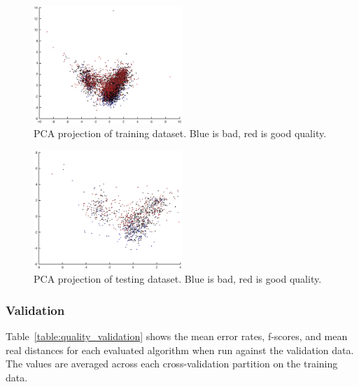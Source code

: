 \documentclass[twoside]{article}
\begin{document}
\begin{multicols}{2}
\begin{figure}[H]
\centering
\includegraphics[width=0.5\textwidth]{qpcatraining}
\caption{PCA projection of training dataset. Blue is bad, red is good quality.}
\label{fig:quality_training_pca}
\end{figure}

\begin{figure}[H]
\centering
\includegraphics[width=0.5\textwidth]{qpcatesting}
\caption{PCA projection of testing dataset. Blue is bad, red is good quality.}
\label{fig:quality_testing_pca}
\end{figure}

\subsubsection{Validation}

Table~\ref{table:quality_validation} shows the mean error rates, f-scores, and mean real distances for each evaluated algorithm when run against the validation data. The values are averaged across each
cross-validation partition on the training data.


\end{multicols}
\end{document}
